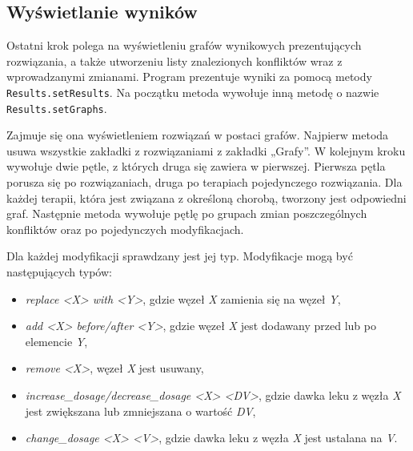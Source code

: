 
\subsection{Wyświetlanie wyników}
\label{sect:revisions}
Ostatni krok polega na wyświetleniu grafów wynikowych prezentujących rozwiązania, a także utworzeniu listy znalezionych konfliktów wraz z wprowadzanymi zmianami. Program prezentuje wyniki za pomocą metody \texttt{Results.setResults}. Na początku metoda wywołuje inną metodę o nazwie \texttt{Results.setGraphs}. 

Zajmuje się ona wyświetleniem rozwiązań w postaci grafów. Najpierw metoda usuwa wszystkie zakładki z rozwiązaniami z zakładki „Grafy”. W kolejnym kroku wywołuje dwie pętle, z których druga się zawiera w pierwszej. Pierwsza pętla porusza się po rozwiązaniach, druga po terapiach pojedynczego rozwiązania. Dla każdej terapii, która jest związana z określoną chorobą, tworzony jest odpowiedni graf. Następnie metoda wywołuje pętlę po grupach zmian poszczególnych konfliktów oraz po pojedynczych modyfikacjach. 

Dla każdej modyfikacji sprawdzany jest jej typ. Modyfikacje mogą być następujących typów:
\begin{itemize}
\item \textit{replace <X> with <Y>}, gdzie węzeł \textit{X} zamienia się na węzeł \textit{Y},
\item \textit{add <X> before/after <Y>}, gdzie węzeł \textit{X} jest dodawany przed lub po elemencie \textit{Y},
\item \textit{remove <X>}, węzeł \textit{X} jest usuwany,
\item \textit{increase\_dosage/decrease\_dosage <X> <DV>}, gdzie dawka leku z węzła \textit{X} jest zwiększana lub zmniejszana o wartość \textit{DV},
\item \textit{change\_dosage <X> <V>}, gdzie dawka leku z węzła \textit{X} jest ustalana na \textit{V}.  
\end{itemize}

